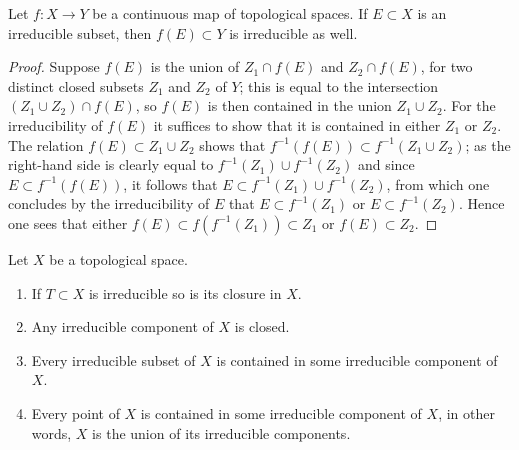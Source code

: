 \begin{lemma}
\label{lemma-image-irreducible-space}
Let $f : X \to Y$ be a continuous map of topological spaces.
If $E \subset X$ is an irreducible subset, then $f(E) \subset Y$
is irreducible as well.
\end{lemma}

\begin{proof}
Suppose $f(E)$ is the union of $Z_1 \cap f(E)$ and $Z_2 \cap f(E)$, for two
distinct closed subsets $Z_1$ and $Z_2$ of $Y$; this is equal to the
intersection $(Z_1 \cup Z_2) \cap f(E)$, so $f(E)$ is then contained in the
union $Z_1 \cup Z_2$.  For the irreducibility of $f(E)$ it suffices to show
that it is contained in either $Z_1$ or $Z_2$. The relation
$f(E) \subset Z_1 \cup Z_2$ shows that
$f^{-1}(f(E)) \subset f^{-1}(Z_1 \cup Z_2)$; as the right-hand side is
clearly equal to $f^{-1}(Z_1) \cup f^{-1}(Z_2)$ and since
$E \subset f^{-1}(f(E))$, it follows that
$E \subset f^{-1}(Z_1) \cup f^{-1}(Z_2)$, from which one concludes by the
irreducibility of $E$ that $E \subset f^{-1}(Z_1)$ or
$E \subset f^{-1}(Z_2)$.  Hence one sees that either
$f(E) \subset f(f^{-1}(Z_1)) \subset Z_1$ or $f(E) \subset Z_2$.
\end{proof}

\begin{lemma}
\label{lemma-irreducible}
Let $X$ be a topological space.
\begin{enumerate}
\item If $T \subset X$ is irreducible so is its closure in $X$.
\item Any irreducible component of $X$ is closed.
\item Every irreducible subset of $X$ is contained in some
irreducible component of $X$.
\item Every point of $X$ is contained in some irreducible component
of $X$, in other words, $X$ is the union of its irreducible components.
\end{enumerate}
\end{lemma}


